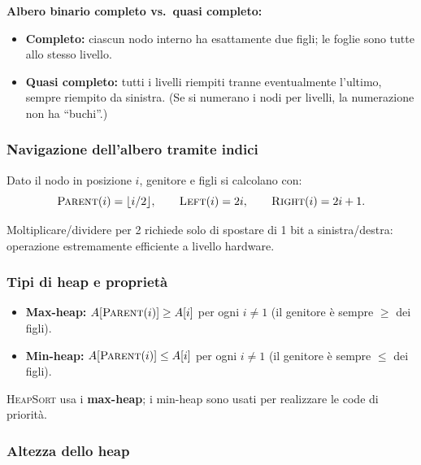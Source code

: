 \begin{nota}
	\textbf{Albero binario completo vs.\ quasi completo:}
	\begin{itemize}
		\item \textbf{Completo:} ciascun nodo interno ha esattamente due
		figli; le foglie sono tutte allo stesso livello.
		\item \textbf{Quasi completo:} tutti i livelli riempiti tranne
		eventualmente l'ultimo, sempre riempito da sinistra.
		(Se si numerano i nodi per livelli, la numerazione non ha
		``buchi''.)
	\end{itemize}
\end{nota}

\subsubsection{Navigazione dell'albero tramite indici}

Dato il nodo in posizione $i$, genitore e figli si calcolano con:
\[
\textsc{Parent}(i) = \lfloor i/2 \rfloor, \qquad
\textsc{Left}(i)   = 2i,               \qquad
\textsc{Right}(i)  = 2i + 1.
\]

\begin{nota}
	Moltiplicare/dividere per 2 richiede solo di spostare di 1 bit a
	sinistra/destra: operazione estremamente efficiente a livello hardware.
\end{nota}

\subsubsection{Tipi di heap e proprietà}

\begin{definizione}
	\begin{itemize}
		\item \textbf{Max-heap:} $A[\textsc{Parent}(i)] \ge A[i]$ per ogni
		$i \ne 1$ (il genitore è sempre $\ge$ dei figli).
		\item \textbf{Min-heap:} $A[\textsc{Parent}(i)] \le A[i]$ per ogni
		$i \ne 1$ (il genitore è sempre $\le$ dei figli).
	\end{itemize}
	\textsc{HeapSort} usa i \textbf{max-heap}; i min-heap sono usati per
	realizzare le code di priorità.
\end{definizione}

\subsubsection{Altezza dello heap}

